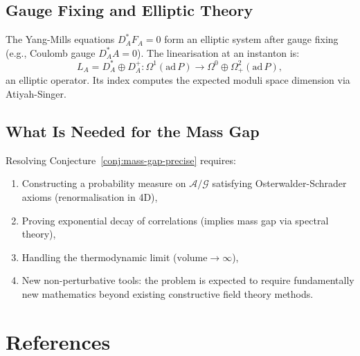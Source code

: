 \documentclass[12pt,a4paper]{amsart}
\theoremstyle{definition}
\theoremstyle{remark}
\begin{document}
\subsection{Gauge Fixing and Elliptic Theory}

The Yang-Mills equations $D_A^* F_A = 0$ form an elliptic system after gauge fixing
(e.g., Coulomb gauge $D_A^* A = 0$). The linearisation at an instanton is:
\[
  L_A = D_A^* \oplus D_A^+: \Omega^1(\mathrm{ad}\, P) \to \Omega^0 \oplus \Omega^2_+(\mathrm{ad}\, P),
\]
an elliptic operator. Its index computes the expected moduli space dimension via
Atiyah-Singer.

\subsection{What Is Needed for the Mass Gap}

Resolving Conjecture~\ref{conj:mass-gap-precise} requires:
\begin{enumerate}[noitemsep]
  \item Constructing a probability measure on $\mathcal{A}/\mathcal{G}$ satisfying
    Osterwalder-Schrader axioms (renormalisation in 4D),
  \item Proving exponential decay of correlations (implies mass gap via spectral theory),
  \item Handling the thermodynamic limit ($\text{volume} \to \infty$),
  \item New non-perturbative tools: the problem is expected to require fundamentally new
    mathematics beyond existing constructive field theory methods.
\end{enumerate}

\section{References}
\end{document}
